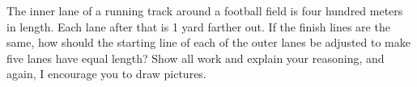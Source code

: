 \documentclass[noauthor,hints,nooutcomes,handout,12pt]{ximera}
\begin{document}
\begin{question}
\end{question}

\mynewpage


\begin{question}
  The inner lane of a running track around a football field is four
  hundred meters in length.  Each lane after that is 1 yard farther
  out.  If the finish lines are the same, how should the starting line
  of each of the outer lanes be adjusted to make five lanes have equal
  length? Show all work and explain your reasoning, and again, I
  encourage you to draw pictures.
\end{question}
\end{document}
